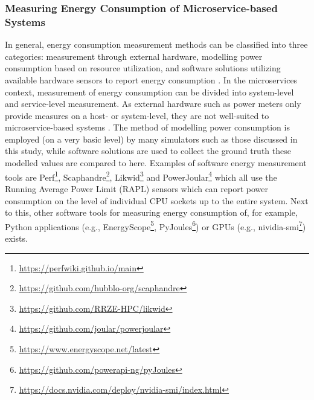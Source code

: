 \subsubsection{Measuring Energy Consumption of Microservice-based Systems}
In general, energy consumption measurement methods can be classified into three categories: measurement through external hardware, modelling power consumption based on resource utilization, and software solutions utilizing available hardware sensors to report energy consumption \cite{noureddine_review_2013}. In the microservices context, measurement of energy consumption can be divided into system-level and service-level measurement. As external hardware such as power meters only provide measures on a host- or system-level, they are not well-suited to microservice-based systems \cite{odea_measurement-driven_2025}. The method of modelling power consumption is employed (on a very basic level) by many simulators such as those discussed in this study, while software solutions are used to collect the ground truth these modelled values are compared to here. Examples of software energy measurement tools are Perf\footnote{\url{https://perfwiki.github.io/main}}, Scaphandre\footnote{\url{https://github.com/hubblo-org/scaphandre}}, Likwid\footnote{\url{https://github.com/RRZE-HPC/likwid}} and PowerJoular\footnote{\url{https://github.com/joular/powerjoular}} which all use the Running Average
Power Limit (RAPL) sensors which can report power consumption on the level of individual CPU sockets up to the entire system\cite{jay_experimental_2023}. Next to this, other software tools for measuring energy consumption of, for example, Python applications (e.g., EnergyScope\footnote{\url{https://www.energyscope.net/latest}}, PyJoules\footnote{\url{https://github.com/powerapi-ng/pyJoules}}) or GPUs (e.g., nividia-smi\footnote{\url{https://docs.nvidia.com/deploy/nvidia-smi/index.html}}) exists.


